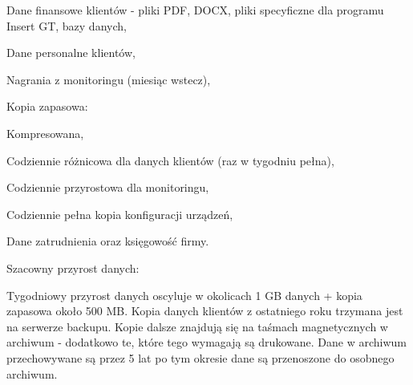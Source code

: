 \begin{minipage}[\right]{15cm}
	\begin{itemize*}
		\item Dane finansowe klientów - pliki PDF, DOCX, pliki specyficzne dla programu Insert GT, bazy danych,
		\item Dane personalne klientów,
		\item Nagrania z monitoringu (miesiąc wstecz),
		\item Kopia zapasowa:
		\begin{itemize*}
			\item Kompresowana,
			\item Codziennie różnicowa dla danych klientów (raz w tygodniu pełna),
			\item Codziennie przyrostowa dla monitoringu,
			\item Codziennie pełna kopia konfiguracji urządzeń,
		\end{itemize*}
		\item Dane zatrudnienia oraz księgowość firmy.
	\end{itemize*}
\end{minipage}

Szacowny przyrost danych:

Tygodniowy przyrost danych oscyluje w okolicach 1 GB danych + kopia zapasowa około 500 MB. Kopia danych klientów z ostatniego roku trzymana jest na serwerze backupu. Kopie dalsze znajdują się na taśmach magnetycznych w archiwum - dodatkowo te, które tego wymagają są drukowane. Dane w archiwum przechowywane są przez 5 lat po tym okresie dane są przenoszone do osobnego archiwum.
